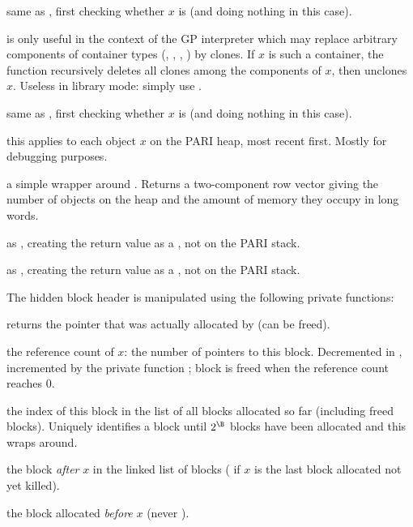  same as , first checking
whether $x$ is  (and doing nothing in this case).

 is only useful in the context of the GP
interpreter which may replace arbitrary components of container types
(, , , ) by clones. If $x$ is such
a container, the function recursively deletes all clones among the components
of $x$, then unclones $x$. Useless in library mode: simply use
.

 same as , first
checking whether $x$ is  (and doing nothing in this case).

 this applies
 to each object $x$ on the PARI heap, most recent
first. Mostly for debugging purposes.

 a simple wrapper around . Returns  a
two-component row vector giving the number of objects on the heap and the
amount of memory they occupy in long words.

 as , creating the return
value as a , not on the PARI stack.

 as , creating the return
value as a , not on the PARI stack.

 The hidden block header is manipulated using the
following private functions:

 returns the pointer that was actually allocated
by  (can be freed).

 the reference count of $x$: the number of pointers
to this block. Decremented in , incremented by the private
function ; block is freed when the reference
count reaches $0$.

 the index of this block in the list of all blocks
allocated so far (including freed blocks). Uniquely identifies a block until
$2^\B$ blocks have been allocated and this wraps around.

 the block \emph{after} $x$ in the linked list of
blocks ( if $x$ is the last block allocated not yet killed).

 the block allocated \emph{before} $x$ (never
).

